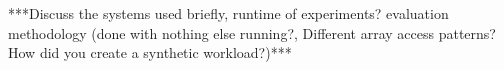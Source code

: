 \section{}

***Discuss the systems used briefly, runtime of experiments? evaluation methodology (done with nothing else running?, Different array access patterns? How did you create a synthetic workload?)***